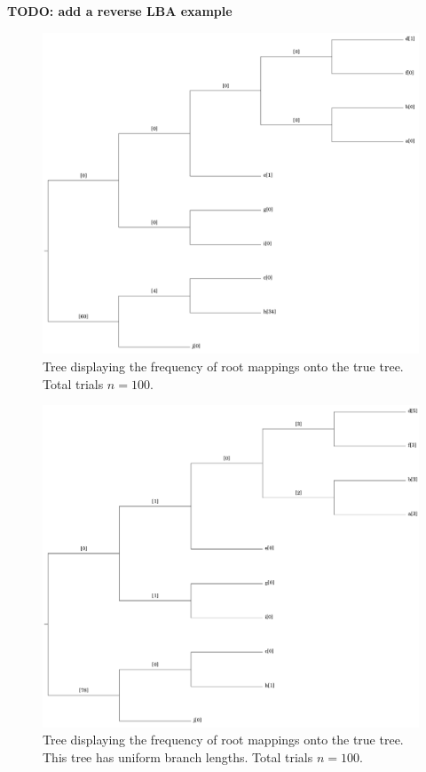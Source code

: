 \documentclass{article}
\begin{document}
{\bf TODO: add a reverse LBA example}

\begin{table}
\begin{center}
  
  \label{table:results}
\end{center}
\end{table}

\begin{figure}
  \includegraphics[width=.9\linewidth]{figs/random_tree_6400_sites.png}
  \caption{Tree displaying the frequency of root mappings onto the true tree.
  Total trials $n=100$.}
  \label{fig:mapped_tree}
\end{figure}

\begin{figure}
  \includegraphics[width=.9\linewidth]{figs/uniform_tree_6400_sites.png}
  \caption{Tree displaying the frequency of root mappings onto the true tree.
    This tree has uniform branch lengths. Total trials $n=100$.}
  \label{fig:mapped_uniform_tree}
\end{figure}
\end{document}
